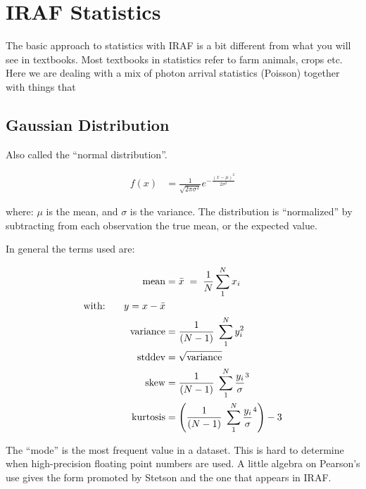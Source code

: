 \clearpage
\section{IRAF Statistics}

The basic approach to statistics with IRAF is a bit different from what you
will see in textbooks. Most textbooks in statistics refer to farm animals,
crops etc. Here we are dealing with a mix of photon arrival statistics
(Poisson) together with things that 


\subsection{Gaussian Distribution}

Also called the ``normal distribution''. 


\begin{subequations}
\begin{align}
f(x) &= \frac{1}{\sqrt{2\pi\sigma^2} } e^{-\frac{(x-\mu)^2}{2\sigma^2}}
\end{align}
\end{subequations}

where:  $\mu$ is the mean, and $\sigma$ is the variance. The distribution is
``normalized'' by subtracting from each observation the true mean, or the expected
value.

\clearpage
In general the terms used are:

\begin{subequations}
\begin{align}
    \textrm{mean} &= \bar{x} \;=\; \frac{1}{N}\sum_{1}^{N} x_{i} \\
\textrm{with:~ ~ ~}  y = x - \bar{x} \notag \\
\textrm{variance} &= \frac{1}{(N-1)}\;\sum_{1}^{N} y_{i}^{2} \\
  \textrm{stddev} &= \sqrt{\textrm{variance}} \\
    \textrm{skew} &= \frac{1}{(N-1)}\;\sum_{1}^{N} \frac{y_{i}}{\sigma}^{3} \\
\textrm{kurtosis} &= \left(  \frac{1}{(N-1)}\;\sum_{1}^{N} \frac{y_{i}}{\sigma}^{4} \right) -3
\end{align}
\end{subequations}

The ``mode'' \cite{wiki-stetson} is the most frequent value in a
dataset. This is hard to determine when high-precision floating point
numbers are used. A little algebra on Pearson's use gives the form
promoted by Stetson and the one that appears in IRAF.

